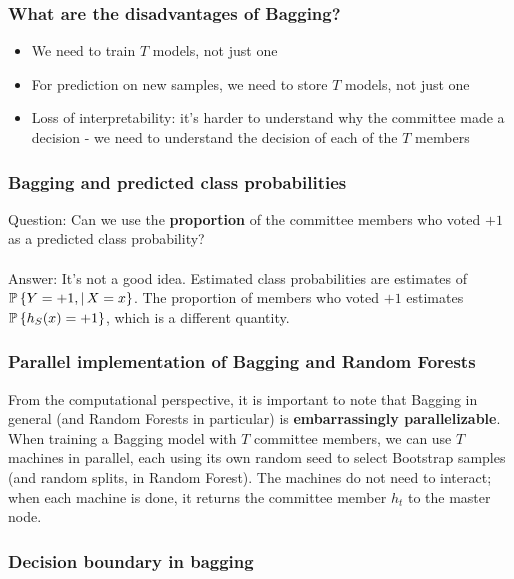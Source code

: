 \documentclass[11pt]{article}
\begin{document}
\subsubsection*{What are the disadvantages of Bagging?}

\begin{itemize}
  \item We need to train $T$ models, not just one
  \item For prediction on new samples, we need to store $T$ models, not just one
  \item Loss of interpretability: it's harder to understand why the committee
    made a decision - we need to understand the decision of each of the $T$
    members
\end{itemize}

\subsubsection*{Bagging and predicted class probabilities}

\noindent 
Question: Can we use the {\bf proportion} of the committee members who voted
$+1$ as a predicted class probability? 
\\~\\
Answer: It's not a good idea. Estimated class probabilities are estimates of 
$\operatorname*{\mathbb{P}}\left\{ Y=+1,|\, X=x \right\}$. The proportion of  members who voted
$+1$ estimates $\operatorname*{\mathbb{P}}\left\{ h_S(x)=+1 \right\}$, which is a different quantity.


\subsubsection*{Parallel implementation of Bagging and Random Forests}

From the computational perspective, it is important to note 
that Bagging in general (and Random Forests in particular) is {\bf embarrassingly
parallelizable}. When training a Bagging model with $T$ committee members, we
can use $T$ machines in parallel, each using its own random seed to select
Bootstrap samples (and random splits, in Random Forest). The machines do not
need to interact; when each machine is done, it returns the committee member
$h_t$ to the master node. 


\subsubsection*{Decision boundary in bagging}
\end{document}
